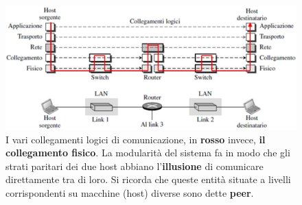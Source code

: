 \documentclass[11pt,a4paper,oneside]{book}
\theoremstyle{definition}
\begin{document}
\begin{figure}[!h]
	\includegraphics[scale=0.5]{Immagini/Logfis.png}
	\centering
	\caption{I vari collegamenti logici di comunicazione, in \textbf{rosso} invece, \textbf{il collegamento fisico}. La modularità del sistema fa in modo che gli strati paritari dei due host abbiano l'\textbf{illusione} di comunicare direttamente tra di loro. Si ricorda che queste entità situate a livelli corrispondenti su macchine (host) diverse sono dette \textbf{peer}.}
\end{figure}
\end{document}
